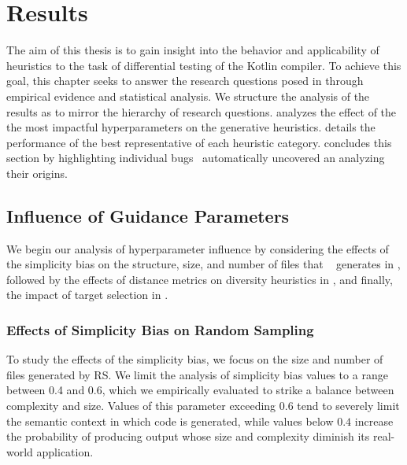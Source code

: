 \chapter{\label{cha:results}Results}

The aim of this thesis is to gain insight into the behavior and applicability
of heuristics to the task of differential testing of the Kotlin compiler.
To achieve this goal, this chapter seeks to answer the research questions posed in
 through empirical evidence and statistical analysis.
We structure the analysis of the results as to mirror the hierarchy
of research questions.
 analyzes the effect of the the most impactful
hyperparameters on the generative heuristics.
 details the performance of the best representative
of each heuristic category.
 concludes this section by highlighting individual
bugs \kf~automatically uncovered an analyzing their origins.

\section{\label{sec:resrq1}Influence of Guidance Parameters}

We begin our analysis of hyperparameter influence by considering the effects of
the simplicity bias on the structure, size, and number of files that \kf~ generates
in , followed by the effects of distance metrics on diversity
heuristics in , and finally, the impact 
of target selection in .

\subsection{\label{subsec:simpl_bias}Effects of Simplicity Bias on Random Sampling}

To study the effects of the simplicity bias, we focus on the size and number of files
generated by \gls{RS}.
We limit the analysis of simplicity bias values to a range between 0.4 and 0.6,
which we empirically evaluated to strike a balance between complexity and size.
Values of this parameter exceeding $0.6$ tend to severely
limit the semantic context in which code is generated,
while values below $0.4$ increase the probability of producing
output whose size and complexity diminish its real-world application.

